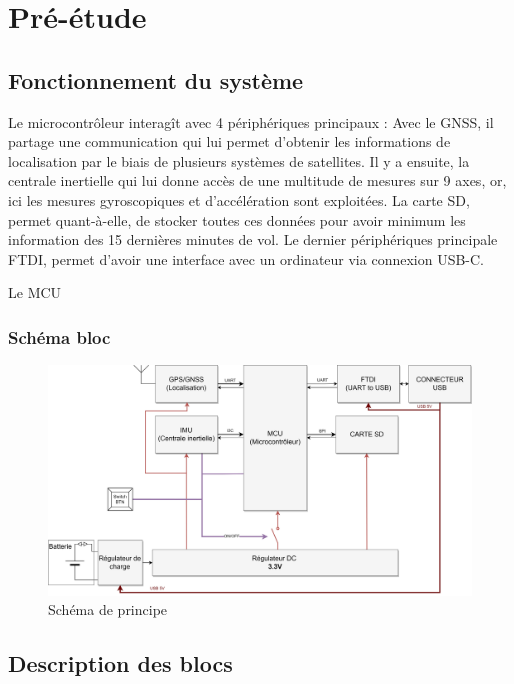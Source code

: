 \section{Pré-étude} \label{sec:Pre-Etude}

\subsection{Fonctionnement du système} \label{ssec:Fonctionnement}
Le microcontrôleur interagît avec 4 périphériques principaux : Avec le \gls{GNSS}, il partage une communication qui lui permet d'obtenir les informations de localisation par le biais de plusieurs systèmes de satellites. Il y a ensuite, la centrale inertielle qui lui donne accès de une multitude de mesures sur 9 axes, or, ici les mesures gyroscopiques et d'accélération sont exploitées. La carte SD, permet quant-à-elle, de stocker toutes ces données pour avoir minimum les information des 15 dernières minutes de vol. Le dernier périphériques principale \gls{FTDI}, permet d'avoir une interface avec un ordinateur via connexion USB-C.

Le \gls{MCU} 

\subsubsection{Schéma bloc} \label{sssec:Schema-bloc}
\begin{figure}[h]
	\centering
	\includegraphics[width=1\textwidth]{../figures/cdc/blocs_grossiers_no_antenna.jpg}
	\caption{Schéma de principe}
	\label{fig:blocsgrossiers}
\end{figure}
\subsection{Description des blocs}

